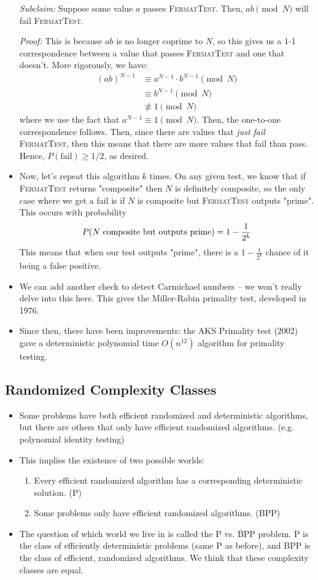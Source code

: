\begin{itemize}
		\textit{Subclaim:} Suppose some value \( a \) passes \textsc{FermatTest}. Then, \( ab \pmod N\)  will fail
		\textsc{FermatTest}. 

		\textit{Proof:} This is because \( ab \) is no longer coprime to \( N \), so this gives us a 
		1-1 correspondence between a value that passes \textsc{FermatTest} and one that doesn't. More 
		rigorously, we have:
		\begin{align*}
			(ab)^{N - 1} & \equiv a^{N - 1} \cdot b^{N - 1}\pmod N\\
						 &\equiv b^{N - 1} \pmod N\\
						 &\not \equiv 1 \pmod N
		\end{align*}
		where we use the fact that \( a^{N - 1} \equiv 1 \pmod N \). Then, the one-to-one correspondence follows.
		Then, since there are values that \textit{just fail} \textsc{FermatTest}, then this means that 
		there are more values that fail than pass. Hence, \( P(\text{fail}) \ge  1 / 2 \), as desired.   
	\item Now, let's repeat this algorithm \( k \) times. On any given test, we know that if \textsc{FermatTest}
		returns "composite" then \( N \) is definitely composite, so the only case where we get a fail is if 
		\( N \) is composite but \textsc{FermatTest} outputs "prime". This occurs with probability 
		\[
		P(\text{\( N \) composite but outputs prime}) = 1 - \frac{1}{2^{k}}
		\] 
		This means that when our test outputs "prime", there is a \( 1 - \frac{1}{2^{k}} \) chance of it being 
		a false positive. 
	\item We can add another check to detect Carmichael numbers -- we won't really delve into this here. This 
		gives the Miller-Rabin primality test, developed in 1976. 
	\item Since then, there have been improvements: the AKS Primality test (2002) gave a deterministic 
		polynomial time \( O(n^{12}) \) algorithm for primality testing.   
\end{itemize}
\subsection{Randomized Complexity Classes}
\begin{itemize}
	\item Some problems have both efficient randomized and deterministic algorithms, but there are others 
		that only have efficient randomized algorithms. (e.g. polynomial identity testing) 
	\item This implies the existence of two possible worlds:
		\begin{enumerate}[label=\arabic*.]
			\item Every efficient randomized algorithm has a corresponding deterministic solution. (P)
			\item Some problems only have efficient randomized algorithms. (BPP)
		\end{enumerate}
	\item The question of which world we live in is called the P vs. BPP problem. P is the class of efficiently 
		deterministic problems (same P as before), and BPP is the class of efficient, randomized algorithms. We 
		think that these complexity classes are equal. 
\end{itemize}
